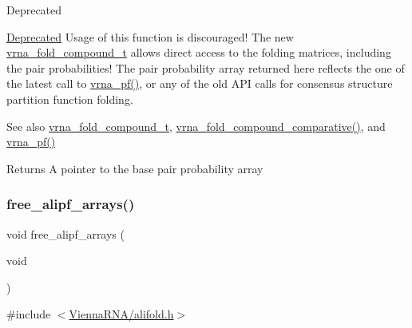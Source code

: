 \begin{DoxyRefDesc}{Deprecated}
\item[\hyperlink{deprecated__deprecated000021}{Deprecated}]Usage of this function is discouraged! The new \hyperlink{group__fold__compound_ga1b0cef17fd40466cef5968eaeeff6166}{vrna\+\_\+fold\+\_\+compound\+\_\+t} allows direct access to the folding matrices, including the pair probabilities! The pair probability array returned here reflects the one of the latest call to \hyperlink{group__pf__fold_ga29e256d688ad221b78d37f427e0e99bc}{vrna\+\_\+pf()}, or any of the old A\+PI calls for consensus structure partition function folding.\end{DoxyRefDesc}


\begin{DoxySeeAlso}{See also}
\hyperlink{group__fold__compound_ga1b0cef17fd40466cef5968eaeeff6166}{vrna\+\_\+fold\+\_\+compound\+\_\+t}, \hyperlink{group__fold__compound_gad6bacc816af274922b13d947f708aa0c}{vrna\+\_\+fold\+\_\+compound\+\_\+comparative()}, and \hyperlink{group__pf__fold_ga29e256d688ad221b78d37f427e0e99bc}{vrna\+\_\+pf()}
\end{DoxySeeAlso}
\begin{DoxyReturn}{Returns}
A pointer to the base pair probability array 
\end{DoxyReturn}
\mbox{\label{group__consensus__pf__fold_ga0c0498f35686e26b38ee460d3db1a661}} 
\subsubsection{\texorpdfstring{free\+\_\+alipf\+\_\+arrays()}{free\_alipf\_arrays()}}
{\footnotesize\ttfamily void free\+\_\+alipf\+\_\+arrays (\begin{DoxyParamCaption}\item[{void}]{ }\end{DoxyParamCaption})}



{\ttfamily \#include $<$\hyperlink{alifold_8h}{Vienna\+R\+N\+A/alifold.\+h}$>$}



